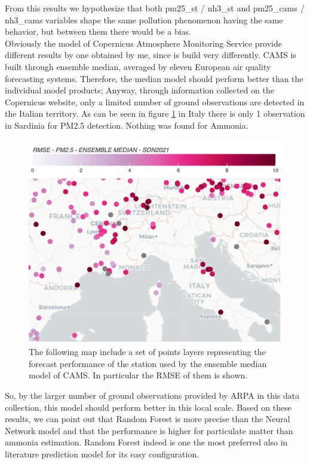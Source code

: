 From this results we hypothesize that both pm25\_st / nh3\_st and pm25\_cams / nh3\_cams variables shape the same pollution phenomenon having the same behavior, but between them there would be a bias.\\
Obviously the model of Copernicus Atmosphere Monitoring Service provide different results by one obtained by me, since is build very differently. CAMS is built through ensemble median, averaged by eleven European air quality forecasting systems. Therefore, the median model should perform better than the individual model products\cite{riccio2007seeking}; 
Anyway, through information collected on the Copernicus website, only a limited number of ground observations are detected in the Italian territory. As can be seen in figure \ref{fig:cams} in Italy there is only 1 observation in Sardinia for PM2.5 detection. Nothing was found for Ammonia.
\begin{figure}[H]
    \centering
    \includegraphics[scale=0.2]{images/cams_obs.png}
    \caption{The following map include a set of points layers representing the forecast performance of the station used by the ensemble median model of CAMS. In particular the RMSE of them is shown\cite{camsobs}. 
}
    \label{fig:cams}
\end{figure}

So, by the larger number of ground observations provided by ARPA in this data collection, this model should perform better in this local scale.
\bigbreak
Based on these results, we can point out that Random Forest is more precise than the  Neural Network model and that the performance is higher for particulate matter than ammonia estimation.
Random Forest indeed is one the most preferred also in literature prediction model for its easy configuration.
